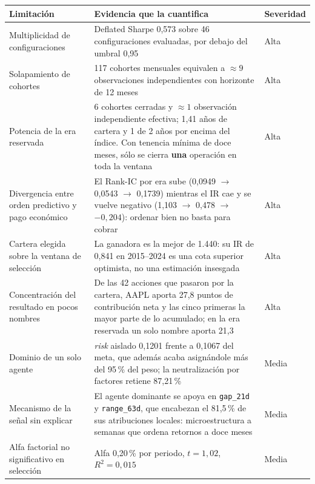 \begin{tabularx}{\textwidth}{lXl}
\toprule
Limitación & Evidencia que la cuantifica & Severidad \\
\midrule
Multiplicidad de configuraciones &
Deflated Sharpe 0,573 sobre 46 configuraciones evaluadas, por debajo del umbral 0,95 &
Alta \\
\addlinespace
Solapamiento de cohortes &
117 cohortes mensuales equivalen a $\approx 9$ observaciones independientes con horizonte de 12
meses &
Alta \\
\addlinespace
Potencia de la era reservada &
6 cohortes cerradas y $\approx 1$ observación independiente efectiva; 1,41 años de cartera y 1 de
2 años por encima del índice. Con tenencia mínima de doce meses, sólo se cierra \textbf{una}
operación en toda la ventana &
Alta \\
\addlinespace
Divergencia entre orden predictivo y pago económico &
El Rank-IC por era sube (0,0949 $\to$ 0,0543 $\to$ 0,1739) mientras el IR cae y se vuelve negativo
(1,103 $\to$ 0,478 $\to$ $-0{,}204$): ordenar bien no basta para cobrar &
Alta \\
\addlinespace
Cartera elegida sobre la ventana de selección &
La ganadora es la mejor de 1.440: su IR de 0,841 en 2015--2024 es una cota superior optimista, no
una estimación insesgada &
Alta \\
\addlinespace
Concentración del resultado en pocos nombres &
De las 42 acciones que pasaron por la cartera, AAPL aporta 27,8 puntos de contribución neta y las
cinco primeras la mayor parte de lo acumulado; en la era reservada un solo nombre aporta 21,3 &
Alta \\
\addlinespace
Dominio de un solo agente &
\textit{risk} aislado 0,1201 frente a 0,1067 del meta, que además acaba asignándole más del
95\,\% del peso; la neutralización por factores retiene 87,21\,\% &
Media \\
\addlinespace
Mecanismo de la señal sin explicar &
El agente dominante se apoya en \texttt{gap\_21d} y \texttt{range\_63d}, que encabezan el
81,5\,\% de sus atribuciones locales: microestructura a semanas que ordena retornos a doce meses &
Media \\
\addlinespace
Alfa factorial no significativo en selección &
Alfa 0,20\,\% por periodo, $t=1{,}02$, $R^2=0{,}015$ &
Media \\

\end{tabularx}

